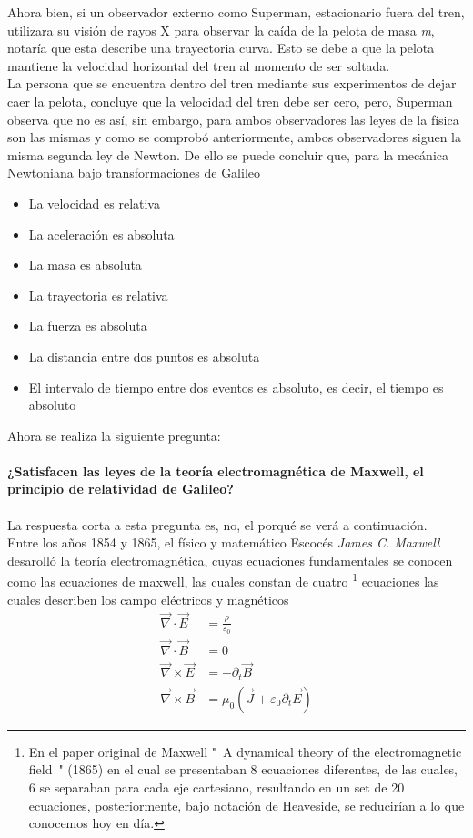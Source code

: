 \documentclass[../main.tex]{subfiles}
\begin{document}
Ahora bien, si un observador externo como Superman, estacionario fuera del tren, utilizara su visión de rayos X para observar la caída de la pelota de masa \emph{m}, notaría que esta describe una trayectoria curva. Esto se debe a que la pelota mantiene la velocidad horizontal del tren al momento de ser soltada. \\ 
La persona que se encuentra dentro del tren mediante sus experimentos de dejar caer la pelota, concluye que la velocidad del tren debe ser cero, pero, Superman observa que no es así, sin embargo, para ambos observadores las leyes de la física son las mismas y como se comprobó anteriormente, ambos observadores siguen la misma segunda ley de Newton. De ello se puede concluir que, para la mecánica Newtoniana bajo transformaciones de Galileo
\begin{itemize}
    \item La velocidad es relativa
    \item La aceleración es absoluta
    \item La masa es absoluta
    \item La trayectoria es relativa
    \item La fuerza es absoluta
    \item La distancia entre dos puntos es absoluta
    \item El intervalo de tiempo entre dos eventos es absoluto, es decir, el tiempo es absoluto
\end{itemize}
Ahora se realiza la siguiente pregunta: \\
\\
\textbf{¿Satisfacen las leyes de la teoría electromagnética de Maxwell, el principio de relatividad de Galileo?} \\
\\
La respuesta corta a esta pregunta es, no, el porqué se verá a continuación. \\
Entre los años 1854 y 1865, el físico y matemático Escocés \emph{James C. Maxwell} desarolló la teoría electromagnética, cuyas ecuaciones fundamentales se conocen como las ecuaciones de maxwell, las cuales constan de cuatro \footnote{En el paper original de Maxwell "\ A dynamical theory of the electromagnetic field\ " (1865) en el cual se presentaban 8 ecuaciones diferentes, de las cuales, 6 se separaban para cada eje cartesiano, resultando en un set de 20 ecuaciones, posteriormente, bajo notación de Heaveside, se reducirían a lo que conocemos hoy en día.} ecuaciones las cuales describen los campo eléctricos y magnéticos
\begin{equation}
    \begin{aligned}
        \vec{\nabla} \cdot \vec{E}& = \frac{\rho}{\varepsilon_0} \\
        \vec{\nabla} \cdot \vec{B}& = 0 \\
        \vec{\nabla} \times \vec{E} & = -\partial_t \vec{B} \\
        \vec{\nabla} \times \vec{B} & = \mu_0 \left( \vec{J} + \varepsilon_0 \partial_t \vec{E} \right)
    \end{aligned}
\end{equation}
\end{document}
